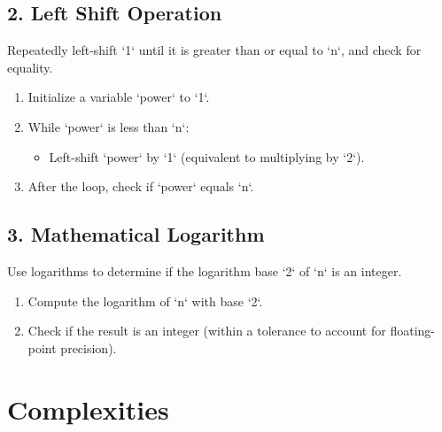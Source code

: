 \subsection*{2. Left Shift Operation}

Repeatedly left-shift `1` until it is greater than or equal to `n`, and check for equality.

\begin{enumerate}
    \item Initialize a variable `power` to `1`.
    \item While `power` is less than `n`:
    \begin{itemize}
        \item Left-shift `power` by `1` (equivalent to multiplying by `2`).
    \end{itemize}
    \item After the loop, check if `power` equals `n`.
\end{enumerate}

\subsection*{3. Mathematical Logarithm}

Use logarithms to determine if the logarithm base `2` of `n` is an integer.

\begin{enumerate}
    \item Compute the logarithm of `n` with base `2`.
    \item Check if the result is an integer (within a tolerance to account for floating-point precision).
\end{enumerate}


\section*{Complexities}

